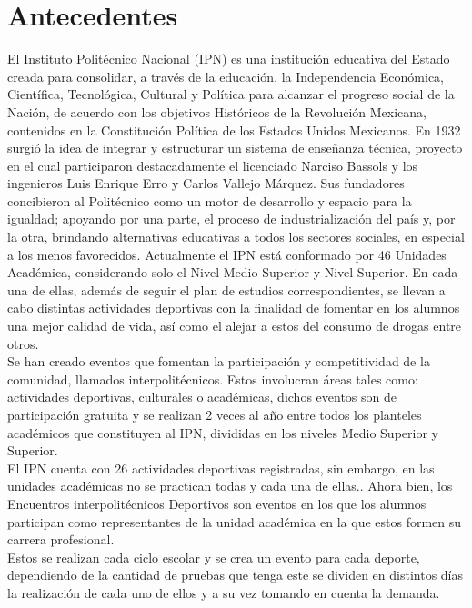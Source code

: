 \section{Antecedentes}
\noindent El Instituto Politécnico Nacional (IPN) es una institución educativa del Estado creada para consolidar, a través de la educación, la Independencia Económica, Científica, Tecnológica, Cultural y Política para alcanzar el progreso social de la Nación, de acuerdo con los objetivos Históricos de la Revolución Mexicana, contenidos en la Constitución Política de los Estados Unidos Mexicanos.
\noindent En 1932 surgió la idea de integrar y estructurar un sistema de enseñanza técnica, proyecto en el cual participaron destacadamente el licenciado Narciso Bassols y los ingenieros Luis Enrique Erro y Carlos Vallejo Márquez.
\noindent Sus fundadores concibieron al Politécnico como un motor de desarrollo y espacio para la igualdad; apoyando por una parte, el proceso de industrialización del país y, por la otra, brindando alternativas educativas a todos los sectores sociales, en especial a los menos favorecidos​\cite{ipnMision}.
\noindent Actualmente el IPN está conformado por 46 Unidades Académica, considerando solo el Nivel Medio Superior y Nivel Superior. En cada una de ellas, además de seguir el plan de estudios correspondientes, se llevan a cabo distintas actividades deportivas con la finalidad de fomentar en los alumnos una mejor calidad de vida, así como el alejar a estos del consumo de drogas entre otros. \\
\noindent Se han creado eventos que fomentan la participación y competitividad de la comunidad, llamados interpolitécnicos. Estos involucran áreas tales como: actividades deportivas, culturales o académicas, dichos eventos son de participación gratuita y se realizan 2 veces al año entre todos los planteles académicos que constituyen al IPN, divididas en los niveles Medio Superior y Superior.  \cite{Reglas}\\
\noindent El IPN cuenta con 26 actividades deportivas registradas, sin embargo, en las unidades académicas no se practican todas y cada una de ellas.\cite{Reglas}.
\noindent Ahora bien, los Encuentros interpolitécnicos Deportivos son eventos en los que los alumnos participan como representantes de la unidad académica en la que estos formen su carrera profesional.\\
\noindent Estos se realizan cada ciclo escolar y se crea un evento para cada deporte, dependiendo de la cantidad de pruebas que tenga este se dividen en distintos días la realización de cada uno de ellos y a su vez tomando en cuenta la demanda.\\

